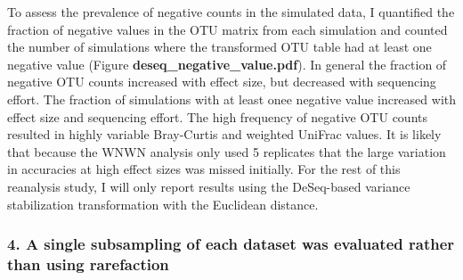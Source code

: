 \documentclass[
]{article}
\begin{document}
To assess the prevalence of negative counts in the simulated data, I
quantified the fraction of negative values in the OTU matrix from each
simulation and counted the number of simulations where the transformed
OTU table had at least one negative value (Figure
\textbf{deseq\_negative\_value.pdf}). In general the fraction of
negative OTU counts increased with effect size, but decreased with
sequencing effort. The fraction of simulations with at least onee
negative value increased with effect size and sequencing effort. The
high frequency of negative OTU counts resulted in highly variable
Bray-Curtis and weighted UniFrac values. It is likely that because the
WNWN analysis only used 5 replicates that the large variation in
accuracies at high effect sizes was missed initially. For the rest of
this reanalysis study, I will only report results using the DeSeq-based
variance stabilization transformation with the Euclidean distance.

\hypertarget{a-single-subsampling-of-each-dataset-was-evaluated-rather-than-using-rarefaction}{%
\subsubsection{4. A single subsampling of each dataset was evaluated
rather than using
rarefaction}\label{a-single-subsampling-of-each-dataset-was-evaluated-rather-than-using-rarefaction}}
\end{document}
